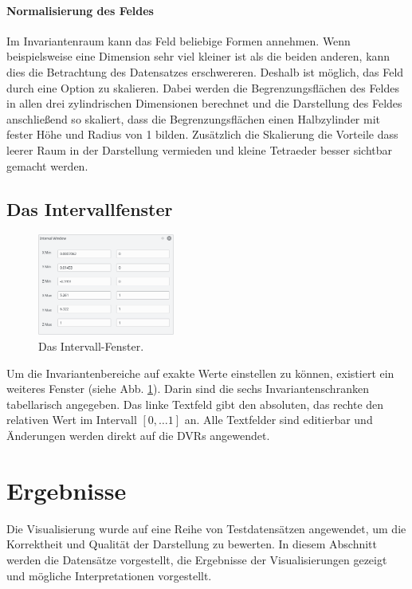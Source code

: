 \documentclass[a4paper,fontsize=12pt,toc=bib,halfparskip]{scrartcl}
\begin{document}
\paragraph{Normalisierung des Feldes}
Im Invariantenraum kann das Feld beliebige Formen annehmen. Wenn beispielsweise eine Dimension sehr viel kleiner ist als die beiden anderen, kann dies die Betrachtung des Datensatzes erschwereren. Deshalb ist m\"oglich, das Feld durch eine Option zu skalieren. Dabei werden die Begrenzungsfl\"achen des Feldes in allen drei zylindrischen Dimensionen berechnet und die Darstellung des Feldes anschlie{\ss}end so skaliert, dass die Begrenzungsfl\"achen einen Halbzylinder mit fester H\"ohe und Radius von 1 bilden. Zus\"atzlich die Skalierung die Vorteile dass leerer Raum in der Darstellung vermieden und kleine Tetraeder besser sichtbar gemacht werden.

\subsection{Das Intervallfenster}
\begin{figure}
	\centering
	\includegraphics[width=0.4\textwidth]{pictures/IntervalWindow.png}
	\caption{Das Intervall-Fenster.}
	\label{IntervalWindow}
\end{figure}
Um die Invariantenbereiche auf exakte Werte einstellen zu k\"onnen, existiert ein weiteres Fenster (siehe Abb. \ref{IntervalWindow}). Darin sind die sechs Invariantenschranken tabellarisch angegeben. Das linke Textfeld gibt den absoluten, das rechte den relativen Wert im Intervall $[0,\dots1]$ an. Alle Textfelder sind editierbar und \"Anderungen werden direkt auf die DVRs angewendet.

\section{Ergebnisse}
\label{sec:Ergebnisse}
Die Visualisierung wurde auf eine Reihe von Testdatens\"atzen angewendet, um die Korrektheit und Qualit\"at der Darstellung zu bewerten. In diesem Abschnitt werden die Datens\"atze vorgestellt, die Ergebnisse der Visualisierungen gezeigt und m\"ogliche Interpretationen vorgestellt.
\end{document}
